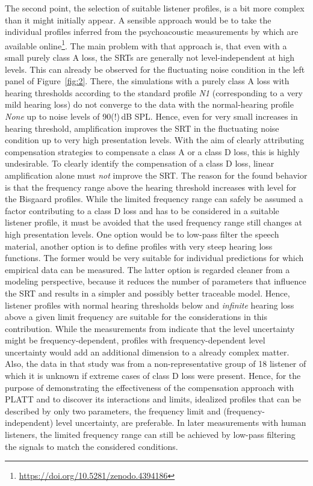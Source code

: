 \documentclass[10pt,a4paper,twocolumn]{article}
\begin{document}
The second point, the selection of suitable listener profiles, is a bit more complex than it might initially appear.
%
A sensible approach would be to take the individual profiles inferred from the psychoacoustic measurements by \cite{schaedler2020a} which are available online\footnote{\url{https://doi.org/10.5281/zenodo.4394186}}.
%
The main problem with that approach is, that even with a small purely class A loss, the SRTs are generally not level-independent at high levels.
%
This can already be observed for the fluctuating noise condition in the left panel of Figure~\ref{fig:2}.
%
There, the simulations with a purely class A loss with hearing thresholds according to the standard profile \emph{N1} (corresponding to a very mild hearing loss) do not converge to the data with the normal-hearing profile \emph{None} up to noise levels of 90(!)\,dB SPL.
%
Hence, even for very small increases in hearing threshold, amplification improves the SRT in the fluctuating noise condition up to very high presentation levels.
%
With the aim of clearly attributing compensation strategies to compensate a class A or a class D loss, this is highly undesirable.
%
To clearly identify the compensation of a class D loss, linear amplification alone must \emph{not} improve the SRT.
%
The reason for the found behavior is that the frequency range above the hearing threshold increases with level for the Bisgaard profiles.
%
While the limited frequency range can safely be assumed a factor contributing to a class D loss and has to be considered in a suitable listener profile, it must be avoided that the used frequency range still changes at high presentation levels.
%
One option would be to low-pass filter the speech material, another option is to define profiles with very steep hearing loss functions.
%
The former would be very suitable for individual predictions for which empirical data can be measured.
%
The latter option is regarded cleaner from a modeling perspective, because it reduces the number of parameters that influence the SRT and results in a simpler and possibly better traceable model.
%
Hence, listener profiles with normal hearing thresholds below and \emph{infinite} hearing loss above a given limit frequency are suitable for the considerations in this contribution.
%
While the measurements from \cite{schaedler2020a} indicate that the level uncertainty might be frequency-dependent, profiles with frequency-dependent level uncertainty would add an additional dimension to a already complex matter.
%
Also, the data in that study was from a non-representative group of 18 listener of which it is unknown if extreme cases of class D loss were present.
%
Hence, for the purpose of demonstrating the effectiveness of the compensation approach with PLATT and to discover its interactions and limits, idealized profiles that can be described by only two parameters, the frequency limit and (frequency-independent) level uncertainty, are preferable.
%
In later measurements with human listeners, the limited frequency range can still be achieved by low-pass filtering the signals to match the considered conditions.
\end{document}
